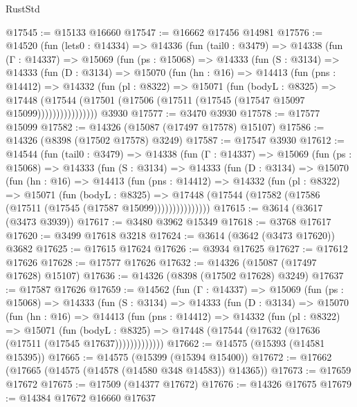 \begin{lexlean}{RustStd}
\begin{coremodule}
@17545 := @15133 @16660
@17547 := @16662 @17456 @14981
@17576 := @14520
    (fun (lets0 : @14334) =>
    @14336
      (fun (tail0 : @3479) =>
      @14338
        (fun (Γ : @14337) =>
        @15069
          (fun (ps : @15068) =>
          @14333
            (fun (S : @3134) =>
            @14333
              (fun (D : @3134) =>
              @15070
                (fun (hn : @16) =>
                @14413
                  (fun (pns : @14412) =>
                  @14332
                    (fun (pl : @8322) =>
                    @15071
                      (fun (bodyL : @8325) =>
                      @17448
                        (@17544
                          (@17501 (@17506 (@17511 (@17545 (@17547 @15097 @15099))))))))))))))))
    @3930
@17577 := @3470 @3930
@17578 := @17577 @15099
@17582 := @14326 (@15087 (@17497 @17578) @15107)
@17586 := @14326 (@8398 (@17502 @17578) @3249)
@17587 := @17547 @3930
@17612 := @14544
    (fun (tail0 : @3479) =>
    @14338
      (fun (Γ : @14337) =>
      @15069
        (fun (ps : @15068) =>
        @14333
          (fun (S : @3134) =>
          @14333
            (fun (D : @3134) =>
            @15070
              (fun (hn : @16) =>
              @14413
                (fun (pns : @14412) =>
                @14332
                  (fun (pl : @8322) =>
                  @15071
                    (fun (bodyL : @8325) =>
                    @17448 (@17544 (@17582 (@17586 (@17511 (@17545 (@17587 @15099)))))))))))))))
@17615 := @3614 (@3617 (@3473 @3939))
@17617 := @3480 @3962 @15349
@17618 := @3768 @17617
@17620 := @3499 @17618 @3218
@17624 := @3614 (@3642 (@3473 @17620)) @3682
@17625 := @17615 @17624
@17626 := @3934 @17625
@17627 := @17612 @17626
@17628 := @17577 @17626
@17632 := @14326 (@15087 (@17497 @17628) @15107)
@17636 := @14326 (@8398 (@17502 @17628) @3249)
@17637 := @17587 @17626
@17659 := @14562
    (fun (Γ : @14337) =>
    @15069
      (fun (ps : @15068) =>
      @14333
        (fun (S : @3134) =>
        @14333
          (fun (D : @3134) =>
          @15070
            (fun (hn : @16) =>
            @14413
              (fun (pns : @14412) =>
              @14332
                (fun (pl : @8322) =>
                @15071
                  (fun (bodyL : @8325) =>
                  @17448 (@17544 (@17632 (@17636 (@17511 (@17545 @17637)))))))))))))
@17662 := @14575 (@15393 (@14581 @15395))
@17665 := @14575 (@15399 (@15394 @15400))
@17672 := @17662 (@17665 (@14575 (@14578 (@14580 @348 @14583)) @14365))
@17673 := @17659 @17672
@17675 := @17509 (@14377 @17672)
@17676 := @14326 @17675
@17679 := @14384 @17672 @16660 @17637

\end{coremodule}
\end{lexlean}
